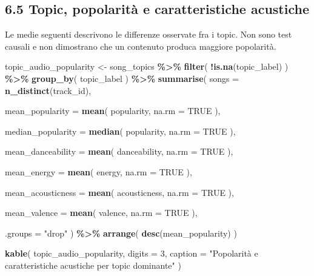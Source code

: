 \documentclass[
]{article}
\newenvironment{Shaded}{\begin{snugshade}}{\end{snugshade}}
\newcommand{\AttributeTok}[1]{\textcolor[rgb]{0.13,0.29,0.53}{#1}}
\newcommand{\ConstantTok}[1]{\textcolor[rgb]{0.56,0.35,0.01}{#1}}
\newcommand{\DecValTok}[1]{\textcolor[rgb]{0.00,0.00,0.81}{#1}}
\newcommand{\FunctionTok}[1]{\textcolor[rgb]{0.13,0.29,0.53}{\textbf{#1}}}
\newcommand{\NormalTok}[1]{#1}
\newcommand{\OtherTok}[1]{\textcolor[rgb]{0.56,0.35,0.01}{#1}}
\newcommand{\SpecialCharTok}[1]{\textcolor[rgb]{0.81,0.36,0.00}{\textbf{#1}}}
\newcommand{\StringTok}[1]{\textcolor[rgb]{0.31,0.60,0.02}{#1}}
\begin{document}
\subsection{6.5 Topic, popolarità e caratteristiche
acustiche}\label{topic-popolarituxe0-e-caratteristiche-acustiche}

Le medie seguenti descrivono le differenze osservate fra i topic. Non
sono test causali e non dimostrano che un contenuto produca maggiore
popolarità.

\begin{Shaded}
\begin{Highlighting}[]
\NormalTok{topic\_audio\_popularity }\OtherTok{\textless{}{-}}\NormalTok{ song\_topics }\SpecialCharTok{\%\textgreater{}\%}
  \FunctionTok{filter}\NormalTok{(}
    \SpecialCharTok{!}\FunctionTok{is.na}\NormalTok{(topic\_label)}
\NormalTok{  ) }\SpecialCharTok{\%\textgreater{}\%}
  \FunctionTok{group\_by}\NormalTok{(}
\NormalTok{    topic\_label}
\NormalTok{  ) }\SpecialCharTok{\%\textgreater{}\%}
  \FunctionTok{summarise}\NormalTok{(}
    \AttributeTok{songs =} \FunctionTok{n\_distinct}\NormalTok{(track\_id),}

    \AttributeTok{mean\_popularity =} \FunctionTok{mean}\NormalTok{(}
\NormalTok{      popularity,}
      \AttributeTok{na.rm =} \ConstantTok{TRUE}
\NormalTok{    ),}

    \AttributeTok{median\_popularity =} \FunctionTok{median}\NormalTok{(}
\NormalTok{      popularity,}
      \AttributeTok{na.rm =} \ConstantTok{TRUE}
\NormalTok{    ),}

    \AttributeTok{mean\_danceability =} \FunctionTok{mean}\NormalTok{(}
\NormalTok{      danceability,}
      \AttributeTok{na.rm =} \ConstantTok{TRUE}
\NormalTok{    ),}

    \AttributeTok{mean\_energy =} \FunctionTok{mean}\NormalTok{(}
\NormalTok{      energy,}
      \AttributeTok{na.rm =} \ConstantTok{TRUE}
\NormalTok{    ),}

    \AttributeTok{mean\_acousticness =} \FunctionTok{mean}\NormalTok{(}
\NormalTok{      acousticness,}
      \AttributeTok{na.rm =} \ConstantTok{TRUE}
\NormalTok{    ),}

    \AttributeTok{mean\_valence =} \FunctionTok{mean}\NormalTok{(}
\NormalTok{      valence,}
      \AttributeTok{na.rm =} \ConstantTok{TRUE}
\NormalTok{    ),}

    \AttributeTok{.groups =} \StringTok{"drop"}
\NormalTok{  ) }\SpecialCharTok{\%\textgreater{}\%}
  \FunctionTok{arrange}\NormalTok{(}
    \FunctionTok{desc}\NormalTok{(mean\_popularity)}
\NormalTok{  )}

\FunctionTok{kable}\NormalTok{(}
\NormalTok{  topic\_audio\_popularity,}
  \AttributeTok{digits =} \DecValTok{3}\NormalTok{,}
  \AttributeTok{caption =} \StringTok{"Popolarità e caratteristiche acustiche per topic dominante"}
\NormalTok{)}
\end{Highlighting}
\end{Shaded}
\end{document}
